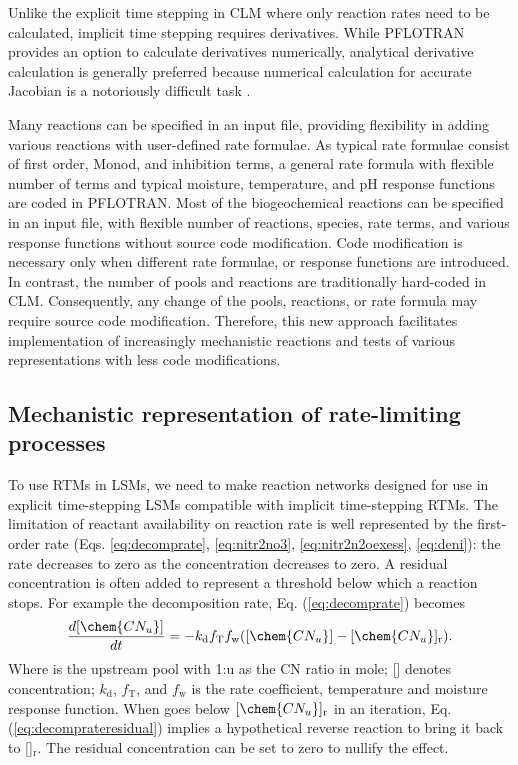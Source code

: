 \documentclass[gmd, manuscript]{copernicus}
\begin{document}
Unlike the explicit time stepping in CLM where only  reaction rates need to be calculated, implicit time stepping requires derivatives.  While PFLOTRAN
provides an option to calculate derivatives numerically, analytical derivative calculation is generally preferred \citep[e.g.,][]{Xu2006} because numerical calculation for accurate Jacobian is a notoriously difficult task \citep{Shampine2005}. 

Many reactions can be specified in an input file, providing flexibility in adding various reactions with user-defined rate formulae. As typical rate formulae consist of first order, Monod, and inhibition terms, a general rate formula with flexible number of terms and typical moisture, temperature, and pH response functions are coded in PFLOTRAN. Most of the biogeochemical reactions can be specified in an input file, with flexible number of reactions, species, rate terms, and various response functions without source code modification. Code modification is necessary only when different rate formulae, or response
functions are introduced. In contrast, the number of pools and reactions are traditionally hard-coded in CLM. Consequently, any change of the pools,
reactions, or rate formula may require source code modification. Therefore, this new approach facilitates implementation of increasingly mechanistic reactions
and tests of various representations with less code modifications.

\subsection{Mechanistic representation of rate-limiting processes}
To use RTMs in LSMs, we need to make reaction networks designed for use in explicit time-stepping LSMs compatible with implicit time-stepping RTMs. The limitation of reactant availability on reaction rate is well represented by the first-order rate (Eqs. \ref{eq:decomprate}, \ref{eq:nitr2no3}, \ref{eq:nitr2n2oexess}, \ref{eq:deni}): the rate decreases to zero as the concentration decreases to zero. A residual concentration is often added to represent a threshold below which a reaction stops. For example the decomposition rate, Eq. (\ref{eq:decomprate}) becomes
\begin{equation}
\frac{d [\chem{CN_u}]}{d t} = -k_\text{d} f_\text{T} f_\text{w}
([\chem{CN_u}] - [\chem{CN_u}]_\text{r}).
\label{eq:decomprateresidual}
\end{equation}
Where  is the upstream pool with 1:u as the CN ratio in mole; [] denotes concentration; $k_\text{d}$, $f_\text{T}$, and $f_\text{w}$ is the rate coefficient, temperature and moisture response function. When  goes below $[\chem{CN_u}]_\text{r}$ in an iteration, Eq. (\ref{eq:decomprateresidual}) implies a hypothetical reverse reaction to bring it back to []$_\text{r}$. The residual concentration can be set to zero to nullify the effect.  
\end{document}
